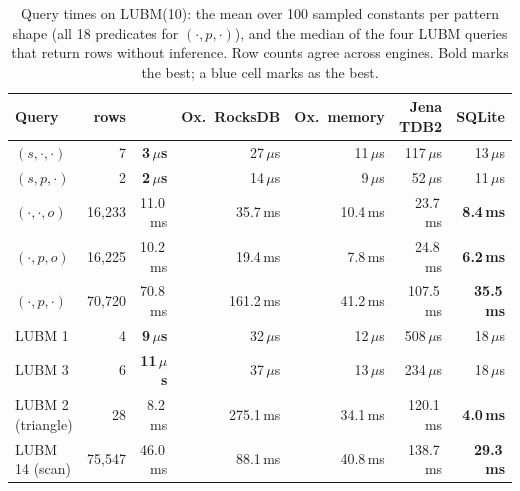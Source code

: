 \begin{table}[t]
\caption{Query times on LUBM(10): the mean over 100 sampled constants per pattern shape (all 18 predicates for $(\cdot,p,\cdot)$), and the median of the four LUBM queries that return rows without inference. Row counts agree across engines. Bold marks the best; a blue cell marks \sys{} as the best.}
\label{tab-queries}
\small
\begin{tabular}{@{}lrrrrrr@{}}
\toprule
Query & rows & \sys{} & Ox.\ RocksDB & Ox.\ memory & Jena TDB2 & SQLite \\
\midrule
$(s,\cdot,\cdot)$ & 7 & \cellcolor{ours}\textbf{3\,$\mu$s} & 27\,$\mu$s & 11\,$\mu$s & 117\,$\mu$s & 13\,$\mu$s \\
$(s,p,\cdot)$ & 2 & \cellcolor{ours}\textbf{2\,$\mu$s} & 14\,$\mu$s & 9\,$\mu$s & 52\,$\mu$s & 11\,$\mu$s \\
$(\cdot,\cdot,o)$ & 16,233 & 11.0\,ms & 35.7\,ms & 10.4\,ms & 23.7\,ms & \textbf{8.4\,ms} \\
$(\cdot,p,o)$ & 16,225 & 10.2\,ms & 19.4\,ms & 7.8\,ms & 24.8\,ms & \textbf{6.2\,ms} \\
$(\cdot,p,\cdot)$ & 70,720 & 70.8\,ms & 161.2\,ms & 41.2\,ms & 107.5\,ms & \textbf{35.5\,ms} \\
\midrule
LUBM 1 & 4 & \cellcolor{ours}\textbf{9\,$\mu$s} & 32\,$\mu$s & 12\,$\mu$s & 508\,$\mu$s & 18\,$\mu$s \\
LUBM 3 & 6 & \cellcolor{ours}\textbf{11\,$\mu$s} & 37\,$\mu$s & 13\,$\mu$s & 234\,$\mu$s & 18\,$\mu$s \\
LUBM 2 (triangle) & 28 & 8.2\,ms & 275.1\,ms & 34.1\,ms & 120.1\,ms & \textbf{4.0\,ms} \\
LUBM 14 (scan) & 75,547 & 46.0\,ms & 88.1\,ms & 40.8\,ms & 138.7\,ms & \textbf{29.3\,ms} \\
\bottomrule
\end{tabular}
\end{table}
